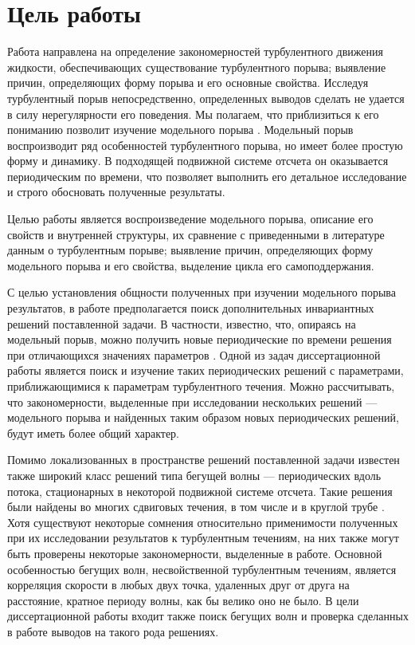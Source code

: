 \section{Цель работы}

Работа направлена на определение закономерностей турбулентного движения жидкости, обеспечивающих существование турбулентного порыва; выявление причин, определяющих форму порыва и его основные свойства. Исследуя турбулентный порыв непосредственно, определенных выводов сделать не удается в силу нерегулярности его поведения. Мы полагаем, что приблизиться к его пониманию позволит изучение модельного порыва \cite{Avila2013}. Модельный порыв воспроизводит ряд особенностей турбулентного порыва, но имеет более простую форму и динамику. В подходящей подвижной системе отсчета он оказывается периодическим по времени, что позволяет выполнить его детальное исследование и строго обосновать полученные результаты.

Целью работы является воспроизведение модельного порыва, описание его свойств и внутренней структуры, их сравнение с приведенными в литературе данным о турбулентным порыве; выявление причин, определяющих форму модельного порыва и его свойства, выделение цикла его самоподдержания. 

С целью установления общности полученных при изучении модельного порыва результатов, в работе предполагается поиск дополнительных инвариантных решений поставленной задачи. В частности, известно, что, опираясь на модельный порыв, можно получить новые периодические по времени решения при отличающихся значениях параметров \cite{Viswanath2007, Dijkstra2014}. Одной из задач диссертационной работы является поиск и изучение таких периодических решений с параметрами, приближающимися к параметрам турбулентного течения. Можно рассчитывать, что закономерности, выделенные при исследовании нескольких решений --- модельного порыва и найденных таким образом новых периодических решений, будут иметь более общий характер. 

Помимо локализованных в пространстве решений поставленной задачи известен также широкий класс решений типа бегущей волны --- периодических вдоль потока, стационарных в некоторой подвижной системе отсчета. Такие решения были найдены во многих сдвиговых течения, в том числе и в круглой трубе \cite{Kawahara2012}. Хотя существуют некоторые сомнения относительно применимости полученных при их исследовании результатов к турбулентным течениям, на них также могут быть проверены некоторые закономерности, выделенные в работе. Основной особенностью бегущих волн, несвойственной турбулентным течениям, является корреляция скорости в любых двух точка, удаленных друг от друга на расстояние, кратное периоду волны, как бы велико оно не было. В цели диссертационной работы входит также поиск бегущих волн и проверка сделанных в работе выводов на такого рода решениях. 


